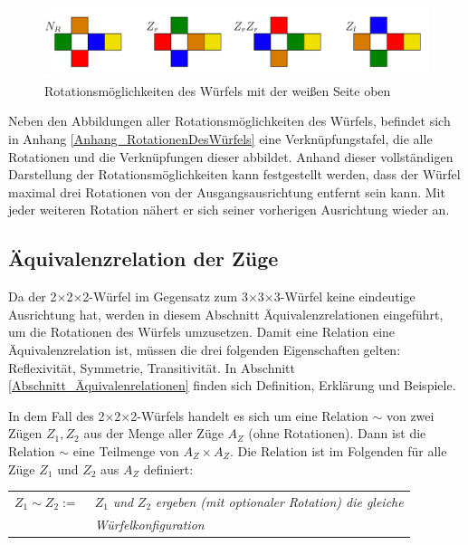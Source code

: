 \documentclass[12pt,a4paper, usenames, dvipsnames]{article}
\theoremstyle{mystyle}
\theoremstyle{definition}
\newcommand{\Ttwo}{2$\times$2$\times$2-}
\newcommand{\Tthree}{3$\times$3$\times$3-}
\begin{document}
\begin{figure}[H]
\centering
\includegraphics[scale=0.063]{RotationWeiss.png}
\caption{Rotationsmöglichkeiten des Würfels mit der weißen Seite oben}
\label{AbbildungWürfelRotationWeisseSeite}
\end{figure}

Neben den Abbildungen aller Rotationsmöglichkeiten des Würfels, befindet sich in Anhang \ref{Anhang_RotationenDesWürfels} eine Verknüpfungstafel, die alle Rotationen und die Verknüpfungen dieser abbildet. Anhand dieser vollständigen Darstellung der Rotationsmöglichkeiten kann festgestellt werden, dass der Würfel maximal drei Rotationen von der Ausgangsausrichtung entfernt sein kann. Mit jeder weiteren Rotation nähert er sich seiner vorherigen Ausrichtung wieder an.





%
%
%
%
%
%
%
%
%
%
%
%
%
%
%
%
%
%
%
%

\subsection{Äquivalenzrelation der Züge}
\label{Abschnitt_ÄquivalenzrelationDerZüge}

Da der \Ttwo Würfel im Gegensatz zum \Tthree Würfel keine eindeutige Ausrichtung hat, werden in diesem Abschnitt Äquivalenzrelationen eingeführt, um die Rotationen des Würfels umzusetzen.
Damit eine Relation eine Äquivalenzrelation ist, müssen die drei folgenden Eigenschaften gelten: Reflexivität, Symmetrie, Transitivität. In Abschnitt \ref{Abschnitt_Äquivalenrelationen} finden sich Definition, Erklärung und Beispiele.

In dem Fall des \Ttwo Würfels handelt es sich um eine Relation $\sim$ von zwei Zügen $Z_1, Z_2$ aus der Menge aller Züge $A_Z$ (ohne Rotationen). Dann ist die Relation $\sim$ eine Teilmenge von $A_Z \times A_Z$. 
Die Relation ist im Folgenden für alle Züge $Z_1$ und $Z_2$ aus $A_Z$ definiert: 

\begin{center}
\begin{tabular}{l l}
$Z_1 \sim Z_2 := \ $  & $Z_1$ \textit{und} $Z_2$ \textit{ergeben (mit optionaler Rotation) die gleiche }\\
\  & \textit{Würfelkonfiguration} \\
\end{tabular} 
\end{center}
\end{document}

